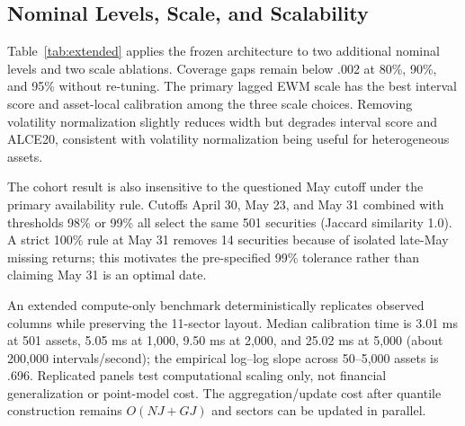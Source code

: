 \documentclass[conference]{IEEEtran}
\begin{document}
\subsection{Nominal Levels, Scale, and Scalability}

Table~\ref{tab:extended} applies the frozen architecture to two additional nominal levels and two scale ablations. Coverage gaps remain below .002 at 80\%, 90\%, and 95\% without re-tuning. The primary lagged EWM scale has the best interval score and asset-local calibration among the three scale choices. Removing volatility normalization slightly reduces width but degrades interval score and ALCE20, consistent with volatility normalization being useful for heterogeneous assets.

The cohort result is also insensitive to the questioned May cutoff under the primary availability rule. Cutoffs April 30, May 23, and May 31 combined with thresholds 98\% or 99\% all select the same 501 securities (Jaccard similarity 1.0). A strict 100\% rule at May 31 removes 14 securities because of isolated late-May missing returns; this motivates the pre-specified 99\% tolerance rather than claiming May 31 is an optimal date.

An extended compute-only benchmark deterministically replicates observed columns while preserving the 11-sector layout. Median calibration time is 3.01 ms at 501 assets, 5.05 ms at 1,000, 9.50 ms at 2,000, and 25.02 ms at 5,000 (about 200,000 intervals/second); the empirical log--log slope across 50--5,000 assets is .696. Replicated panels test computational scaling only, not financial generalization or point-model cost. The aggregation/update cost after quantile construction remains $O(NJ+GJ)$ and sectors can be updated in parallel.
\end{document}
